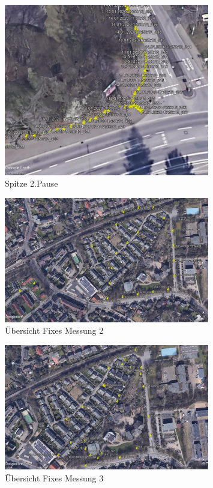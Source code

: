 \begin{figure}[h!]
    \centering
    \includegraphics[width=0.8\textwidth]{Route1_abweichung_pause_2}
    \caption{Spitze 2.Pause}
    \label{fig:map}
\end{figure}

\begin{figure}[h!]
    \centering
    \includegraphics[width=0.8\textwidth]{Route2}
    \caption{Übersicht Fixes Messung 2}
    \label{fig:map}
\end{figure}

\begin{figure}[h!]
    \centering
    \includegraphics[width=0.8\textwidth]{Route3}
    \caption{Übersicht Fixes Messung 3}
    \label{fig:map}
\end{figure}


